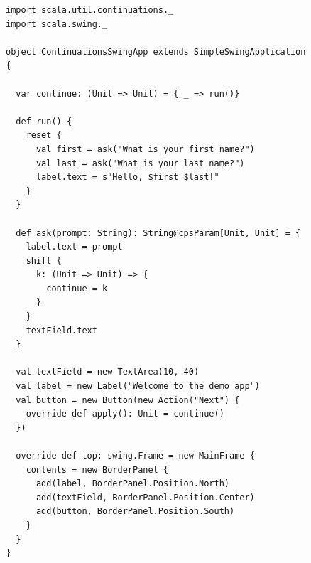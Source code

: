 \begin{figure}

    \begin{minipage}{.7\linewidth}
      \centering
        \begin{lstlisting}
import scala.util.continuations._
import scala.swing._

object ContinuationsSwingApp extends SimpleSwingApplication {

  var continue: (Unit => Unit) = { _ => run()}

  def run() {
    reset {
      val first = ask("What is your first name?")
      val last = ask("What is your last name?")
      label.text = s"Hello, $first $last!"
    }
  }

  def ask(prompt: String): String@cpsParam[Unit, Unit] = {
    label.text = prompt
    shift {
      k: (Unit => Unit) => {
        continue = k
      }
    }
    textField.text
  }

  val textField = new TextArea(10, 40)
  val label = new Label("Welcome to the demo app")
  val button = new Button(new Action("Next") {
    override def apply(): Unit = continue()
  })

  override def top: swing.Frame = new MainFrame {
    contents = new BorderPanel {
      add(label, BorderPanel.Position.North)
      add(textField, BorderPanel.Position.Center)
      add(button, BorderPanel.Position.South)
    }
  }
}
\end{lstlisting}
    \end{minipage}%
    \begin{minipage}{.3\linewidth}
      \centering


\end{minipage}
\end{figure}
